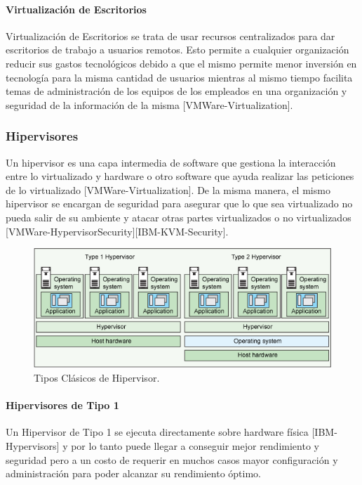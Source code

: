 \paragraph{Virtualización de Escritorios}
Virtualización de Escritorios se trata de usar recursos centralizados para dar escritorios de trabajo a usuarios remotos. Esto permite a cualquier organización reducir sus gastos tecnológicos debido a que el mismo permite menor inversión en tecnología para la misma cantidad de usuarios mientras al mismo tiempo facilita temas de administración de los equipos de los empleados en una organización y seguridad de la información de la misma [VMWare-Virtualization].

\subsubsection{Hipervisores}
Un hipervisor es una capa intermedia de software que gestiona la interacción entre lo virtualizado y hardware o otro software que ayuda realizar las peticiones de lo virtualizado [VMWare-Virtualization]. De la misma manera, el mismo hipervisor se encargan de seguridad para asegurar que lo que sea virtualizado no pueda salir de su ambiente y atacar otras partes virtualizados o no virtualizados [VMWare-HypervisorSecurity][IBM-KVM-Security].

\begin{figure}
  \begin{center}
      \includegraphics[width=\textwidth]{Figures/ibm-hypervisortypes.png}
  \end{center}
  \caption{Tipos Clásicos de Hipervisor.} 
  \label{IBM-HypervisorTypes}
\end{figure}

\paragraph{Hipervisores de Tipo 1}
Un Hipervisor de Tipo 1 se ejecuta directamente sobre hardware física [IBM-Hypervisors] y por lo tanto puede llegar a conseguir mejor rendimiento y seguridad pero a un costo de requerir en muchos casos mayor configuración y administración para poder alcanzar su rendimiento óptimo.

